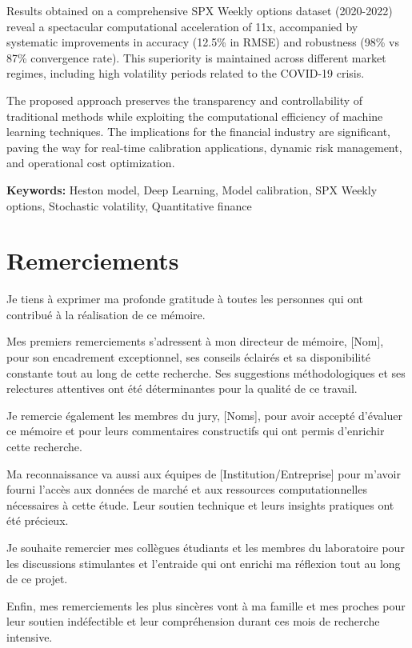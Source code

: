 \documentclass[12pt,a4paper,oneside]{report}
\begin{document}
Results obtained on a comprehensive SPX Weekly options dataset (2020-2022) reveal a spectacular computational acceleration of 11x, accompanied by systematic improvements in accuracy (12.5\% in RMSE) and robustness (98\% vs 87\% convergence rate). This superiority is maintained across different market regimes, including high volatility periods related to the COVID-19 crisis.

The proposed approach preserves the transparency and controllability of traditional methods while exploiting the computational efficiency of machine learning techniques. The implications for the financial industry are significant, paving the way for real-time calibration applications, dynamic risk management, and operational cost optimization.

\textbf{Keywords:} Heston model, Deep Learning, Model calibration, SPX Weekly options, Stochastic volatility, Quantitative finance

\newpage
\chapter*{Remerciements}

Je tiens à exprimer ma profonde gratitude à toutes les personnes qui ont contribué à la réalisation de ce mémoire.

Mes premiers remerciements s'adressent à mon directeur de mémoire, [Nom], pour son encadrement exceptionnel, ses conseils éclairés et sa disponibilité constante tout au long de cette recherche. Ses suggestions méthodologiques et ses relectures attentives ont été déterminantes pour la qualité de ce travail.

Je remercie également les membres du jury, [Noms], pour avoir accepté d'évaluer ce mémoire et pour leurs commentaires constructifs qui ont permis d'enrichir cette recherche.

Ma reconnaissance va aussi aux équipes de [Institution/Entreprise] pour m'avoir fourni l'accès aux données de marché et aux ressources computationnelles nécessaires à cette étude. Leur soutien technique et leurs insights pratiques ont été précieux.

Je souhaite remercier mes collègues étudiants et les membres du laboratoire pour les discussions stimulantes et l'entraide qui ont enrichi ma réflexion tout au long de ce projet.

Enfin, mes remerciements les plus sincères vont à ma famille et mes proches pour leur soutien indéfectible et leur compréhension durant ces mois de recherche intensive.
\end{document}
